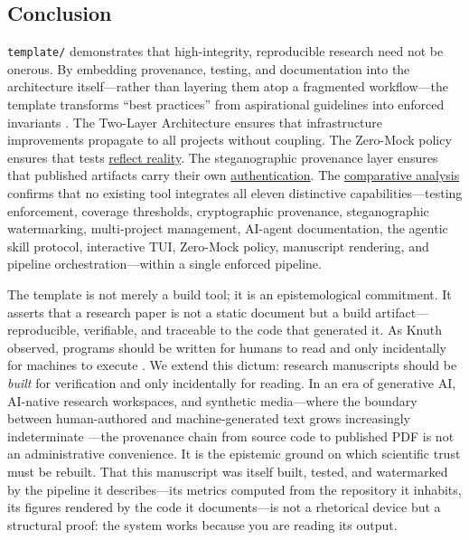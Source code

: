 \documentclass[
  english,
]{article}
\begin{document}
\subsection{Conclusion}\label{conclusion}

\texttt{template/} demonstrates that high-integrity, reproducible
research need not be onerous. By embedding provenance, testing, and
documentation into the architecture itself---rather than layering them
atop a fragmented workflow---the template transforms ``best practices''
from aspirational guidelines into enforced invariants
\citep{wilson2017good, sandve2013ten, lamprecht2020towards}. The
Two-Layer Architecture ensures that infrastructure improvements
propagate to all projects without coupling. The Zero-Mock policy ensures
that tests
\href{05a_zeromock_tradeoff.md\#the-zero-mock-tradeoff}{reflect
reality}. The steganographic provenance layer ensures that published
artifacts carry their own
\href{07_security_provenance.md\#security-and-provenance}{authentication}.
The \href{08f_appendix_matrix.md\#appendix-matrix}{comparative analysis}
confirms that no existing tool integrates all eleven distinctive
capabilities---testing enforcement, coverage thresholds, cryptographic
provenance, steganographic watermarking, multi-project management,
AI-agent documentation, the agentic skill protocol, interactive TUI,
Zero-Mock policy, manuscript rendering, and pipeline
orchestration---within a single enforced pipeline.

The template is not merely a build tool; it is an epistemological
commitment. It asserts that a research paper is not a static document
but a build artifact---reproducible, verifiable, and traceable to the
code that generated it. As Knuth observed, programs should be written
for humans to read and only incidentally for machines to execute
\citep{knuth1984literate}. We extend this dictum: research manuscripts
should be \emph{built} for verification and only incidentally for
reading. In an era of generative AI, AI-native research workspaces, and
synthetic media---where the boundary between human-authored and
machine-generated text grows increasingly indeterminate
\citep{gruenpeter2021research}---the provenance chain from source code
to published PDF is not an administrative convenience. It is the
epistemic ground on which scientific trust must be rebuilt. That this
manuscript was itself built, tested, and watermarked by the pipeline it
describes---its metrics computed from the repository it inhabits, its
figures rendered by the code it documents---is not a rhetorical device
but a structural proof: the system works because you are reading its
output.
\end{document}
